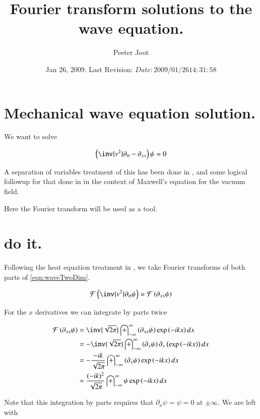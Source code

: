 \documentclass{article}
\title{ Fourier transform solutions to the wave equation. }
\author{Peeter Joot}
\date{ Jan 26, 2009.  Last Revision: $Date: 2009/01/26 14:31:58 $ }
\newcommand{\FF}[0]{\mathcal{F}}
\newcommand{\IIinf}[0]{ \int_{-\infty}^\infty }
\begin{document}
\maketitle{}

\section{ Mechanical wave equation solution. }

We want to solve

\begin{align}\label{eqn:waveTwoDim}
\left(\inv{v^2} \partial_{tt} - \partial_{xx}\right) \psi = 0
\end{align}

A separation of variables treatment of this has been done in
\cite{PJwaveFourVector}, and some logical followup for that done in
\cite{PJemWave} in the context of Maxwell's equation for the vacuum field.

Here the Fourier transform will be used as a tool.

\section{ do it. }

Following the heat equation treatment in \cite{PJheatFourier}, we take Fourier transforms 
of both parts of \ref{eqn:waveTwoDim}.

\begin{align*}
\FF\left( \inv{v^2} \partial_{tt} \psi \right) = \FF\left( \partial_{xx} \psi \right)
\end{align*}

For the $x$ derivatives we can integrate by parts twice

\begin{align*}
\FF\left( \partial_{xx} \psi \right)
&= \inv{\sqrt{2 \pi}} \IIinf \left( \partial_{xx} \psi \right) \exp\left( -i k x \right) dx \\
&= -\inv{\sqrt{2 \pi}} \IIinf \left( \partial_{x} \psi \right) \partial_x\left(\exp\left( -i k x \right) \right) dx \\
&= -\frac{-i k}{\sqrt{2 \pi}} \IIinf \left( \partial_{x} \psi \right) \exp\left( -i k x \right) dx \\
&= \frac{(-i k)^2}{\sqrt{2 \pi}} \IIinf \psi \exp\left( -i k x \right) dx \\
\end{align*}

Note that this integration by parts requires that $\partial_x \psi = \psi = 0$ at $\pm \infty$.  We are left with 
\end{document}
